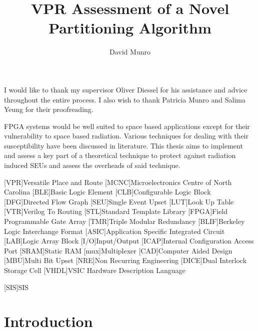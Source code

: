 \documentclass[12pt,final,oneside]{dwThesis} %
\title{VPR Assessment of a Novel Partitioning Algorithm}
\author{David Munro}
\begin{document}
\maketitle
\begin{acknowledgements}
I would like to thank my supervisor Oliver Diessel for his assistance and advice throughout the entire process. I also wish to thank Patricia Munro and Salima Yeung for their proofreading.

\end{acknowledgements}
\begin{abstracts}
	\ac{FPGA} systems would be well suited to space based applications except for their vulnerability to space based radiation. Various techniques for dealing with their susceptibility have been discussed in literature. This thesis aims to implement and assess a key part of a theoretical technique to protect against radiation induced \acp{SEU} and assess the overheads of said technique.
\acresetall
\end{abstracts}
\newpage
\tableofcontents*
\newpage

\begin{acronym}
[VPR]{Versatile Place and Route}
[MCNC]{Microelectronics Centre of North Carolina}
[BLE]{Basic Logic Element}
[CLB]{Configurable Logic Block}
[DFG]{Directed Flow Graph}
[SEU]{Single Event Upset}
[LUT]{Look Up Table}
[VTR]{Verilog To Routing}
[STL]{Standard Template Library}
[FPGA]{Field Programmable Gate Array}
[TMR]{Triple Modular Redundancy}
[BLIF]{Berkeley Logic Interchange Format}
[ASIC]{Application Specific Integrated Circuit}
[LAB]{Logic Array Block}
[I/O]{Input/Output}
[ICAP]{Internal Configuration Access Port}
[SRAM]{Static RAM}
[mux]{Multiplexer}
[CAD]{Computer Aided Design}
[MBU]{Multi Bit Upset}
[NRE]{Non Recurring Engineering}
[DICE]{Dual Interlock Storage Cell}
[VHDL]{VSIC Hardware Description Language}

[SIS]{SIS}
\end{acronym}
\chapter{Introduction}
\end{document}
